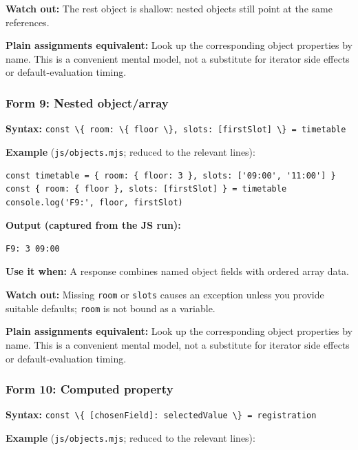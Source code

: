 \documentclass[
  10pt,
]{article}
\newcommand{\passthrough}[1]{#1}
\begin{document}
\textbf{Watch out:} The rest object is shallow: nested objects still
point at the same references.

\textbf{Plain assignments equivalent:} Look up the corresponding object
properties by name. This is a convenient mental model, not a substitute
for iterator side effects or default-evaluation timing.

\subsubsection{Form 9: Nested
object/array}\label{form-9-nested-objectarray}

\textbf{Syntax:}
\passthrough{\lstinline!const \{ room: \{ floor \}, slots: [firstSlot] \} = timetable!}

\textbf{Example} (\passthrough{\lstinline!js/objects.mjs!}; reduced to
the relevant lines):

\begin{lstlisting}
const timetable = { room: { floor: 3 }, slots: ['09:00', '11:00'] }
const { room: { floor }, slots: [firstSlot] } = timetable
console.log('F9:', floor, firstSlot)
\end{lstlisting}

\textbf{Output (captured from the JS run):}

\begin{lstlisting}
F9: 3 09:00
\end{lstlisting}

\textbf{Use it when:} A response combines named object fields with
ordered array data.

\textbf{Watch out:} Missing \passthrough{\lstinline!room!} or
\passthrough{\lstinline!slots!} causes an exception unless you provide
suitable defaults; \passthrough{\lstinline!room!} is not bound as a
variable.

\textbf{Plain assignments equivalent:} Look up the corresponding object
properties by name. This is a convenient mental model, not a substitute
for iterator side effects or default-evaluation timing.

\subsubsection{Form 10: Computed
property}\label{form-10-computed-property}

\textbf{Syntax:}
\passthrough{\lstinline!const \{ [chosenField]: selectedValue \} = registration!}

\textbf{Example} (\passthrough{\lstinline!js/objects.mjs!}; reduced to
the relevant lines):
\end{document}
